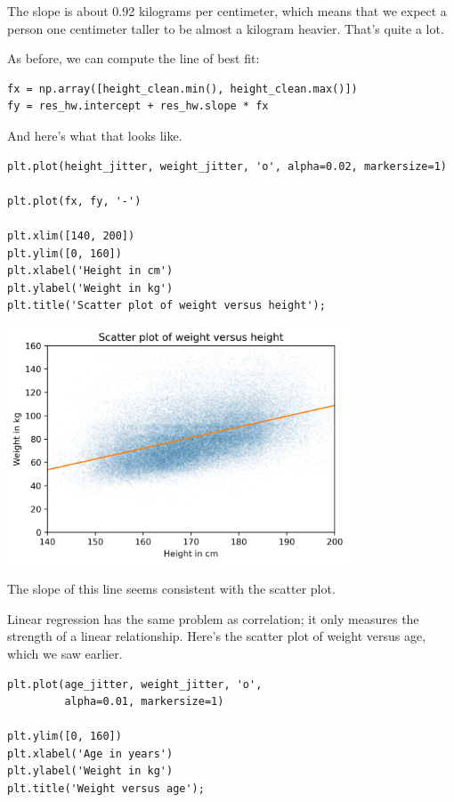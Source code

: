 The slope is about 0.92 kilograms per centimeter, which means that we
expect a person one centimeter taller to be almost a kilogram heavier.
That's quite a lot.

As before, we can compute the line of best fit:

\begin{lstlisting}[]
fx = np.array([height_clean.min(), height_clean.max()])
fy = res_hw.intercept + res_hw.slope * fx
\end{lstlisting}

And here's what that looks like.

\begin{lstlisting}[]
plt.plot(height_jitter, weight_jitter, 'o', alpha=0.02, markersize=1)

plt.plot(fx, fy, '-')

plt.xlim([140, 200])
plt.ylim([0, 160])
plt.xlabel('Height in cm')
plt.ylabel('Weight in kg')
plt.title('Scatter plot of weight versus height');
\end{lstlisting}

\begin{center}
\includegraphics[width=4in]{09_relationships_files/09_relationships_101_0.png}
\end{center}

The slope of this line seems consistent with the scatter plot.

Linear regression has the same problem as correlation; it only measures
the strength of a linear relationship. Here's the scatter plot of weight
versus age, which we saw earlier.

\begin{lstlisting}[]
plt.plot(age_jitter, weight_jitter, 'o', 
         alpha=0.01, markersize=1)

plt.ylim([0, 160])
plt.xlabel('Age in years')
plt.ylabel('Weight in kg')
plt.title('Weight versus age');
\end{lstlisting}

